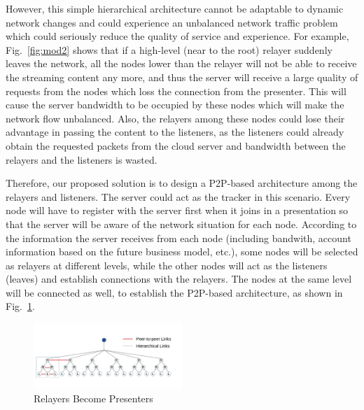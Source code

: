 However, this simple hierarchical architecture cannot be adaptable to 
dynamic network changes and could experience an unbalanced network 
traffic problem which could seriously reduce the quality of service and 
experience. For example, Fig.~\ref{fig:mod2} shows that if a 
high-level (near to the root) relayer suddenly leaves the network, all the 
nodes lower than the relayer will not be able to receive the streaming content 
any more, and thus the server will receive a large quality of requests from the 
nodes which loss the connection from the presenter. This will cause the server 
bandwidth to be occupied by these nodes which will make the network flow 
unbalanced. Also, the relayers among these nodes could lose their advantage in 
passing the content to the listeners, as the listeners could already obtain the 
requested packets from the cloud server and bandwidth between the relayers 
and the listeners is wasted. 

Therefore, our proposed solution is to design a P2P-based 
architecture among the relayers 
and listeners. The server could act as the tracker in this scenario. Every node 
will have to register with the server first when it joins in a presentation so 
that the server will be aware of the network situation for each node. According 
to the information the server receives from each node (including bandwith, 
account information based on the future business model, etc.), some nodes will 
be selected as relayers at different levels, while the other nodes will act as 
the listeners (leaves) and establish connections with the relayers. The nodes 
at the same level will be connected as well, to establish the P2P-based 
architecture, as shown in Fig.~\ref{fig:mod3}.


\begin{figure}[h!]  
  \centering
      \includegraphics[width=0.5\textwidth]{figures/model3_test2.jpg}
  \caption{Relayers Become Presenters}
  \label{fig:mod3}
\end{figure}

